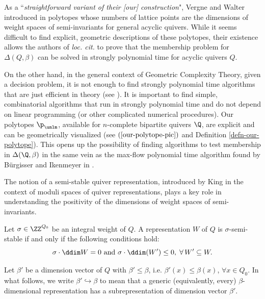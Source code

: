 \begin{rema}\label{rmk-abstract-vs-explicit-polytopes}
As a ``\emph{straightforward variant of their [our] construction}", Vergne and Walter introduced in \cite{Ver-Wal-2023} polytopes whose numbers of lattice points are the dimensions of weight spaces of semi-invariants for general acyclic quivers. While it seems difficult to find explicit, geometric descriptions of these polytopes, their existence allows the authors of \emph{loc. cit.} to prove that the membership problem for $\Delta(Q, \beta)$ can be solved in strongly polynomial time for acyclic quivers $Q$.

On the other hand, in the general context of Geometric Complexity Theory, given a decision problem, it is not enough to find strongly polynomial time algorithms that are just efficient in theory (see \cite[pages 106-107]{MNS}). It is important to find simple, combinatorial algorithms that run in strongly polynomial time and do not depend on linear programming (or other complicated numerical procedures). Our polytopes $\p_{\unlm}$, available for $n$-complete bipartite quivers $\Q$, are explicit and can be geometrically visualized (see $(\ref{our-polytope-pic})$ and Definition \ref{defn-our-polytope}). This opens up the possibility of finding algorithms to test membership in $\Delta(\Q, \beta)$ in the same vein as the max-flow polynomial time algorithm found by B{\"u}rgisser and Ikenmeyer in \cite{BI}. 
\end{rema}

The notion of a semi-stable quiver representation, introduced by King \cite{K} in the context of moduli spaces of quiver representations, plays a key role in understanding the positivity of the dimensions of weight spaces of semi-invariants. 

Let $\sigma \in \ZZ^{Q_0}$ be an integral weight of $Q$. A representation $W$ of $Q$ is $\sigma$-semi-stable if and only if the following conditions hold:
\begin{equation} \label{semi-stab-rep}
\sigma \cdot \ddim W=0 \text{~and~} \sigma \cdot \ddim(W')\leq 0, \; \forall \, W' \subseteq W.
\end{equation}

Let $\beta'$ be a dimension vector of $Q$ with $\beta'\leq \beta$, i.e. $\beta'(x) \leq \beta(x)$, $\forall x \in Q_0$. In what follows, we write $\beta' \hookrightarrow \beta$ to mean that a generic (equivalently, every) $\beta$-dimensional representation has a subrepresentation of dimension vector $\beta'$.  

